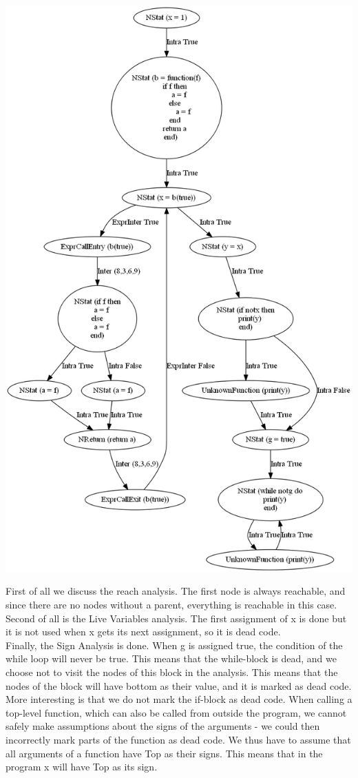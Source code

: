 \documentclass[10pt]{article}
\begin{document}
\includegraphics[scale=0.45]{utTesta.png}

First of all we discuss the reach analysis. The first node is always reachable, and since there are no nodes without a parent, everything is reachable in this case.\\
Second of all is the Live Variables analysis. The first assignment of x is done but it is not used when x gets its next assignment, so it is dead code.\\
Finally, the Sign Analysis is done. When g is assigned true, the condition of the while loop will never be true. This means that the while-block is dead, and we choose not to visit the nodes of this block in the analysis. This means that the nodes of the block will have bottom as their value, and it is marked as dead code.\\
More interesting is that we do not mark the if-block as dead code. When calling a top-level function, which can also be called from outside the program, we cannot safely make assumptions about the signs of the arguments - we could then incorrectly mark parts of the function as dead code. We thus have to assume that all arguments of a function have Top as their signs. This means that in the program x will have Top as its sign.
\end{document}
